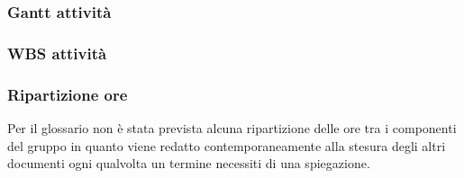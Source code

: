 \subsubsection{Gantt attività}

\subsubsection{WBS attività}
\begin{figure}[H]
	\centering
    \scalebox{0.8}{}
\end{figure}

\subsubsection{Ripartizione ore}
Per il glossario non è stata prevista alcuna ripartizione delle ore tra i componenti del gruppo in quanto viene redatto contemporaneamente alla stesura degli altri documenti ogni qualvolta un termine necessiti di una spiegazione.
\bgroup
